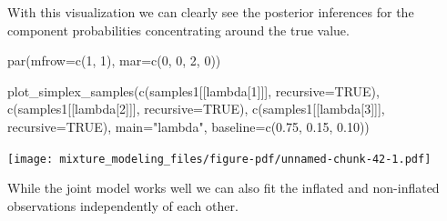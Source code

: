 \documentclass[
  letterpaper,
  DIV=11,
  numbers=noendperiod]{scrartcl}
\newenvironment{Shaded}{\begin{snugshade}}{\end{snugshade}}
\newcommand{\AttributeTok}[1]{\textcolor[rgb]{0.40,0.45,0.13}{#1}}
\newcommand{\ConstantTok}[1]{\textcolor[rgb]{0.56,0.35,0.01}{#1}}
\newcommand{\DecValTok}[1]{\textcolor[rgb]{0.68,0.00,0.00}{#1}}
\newcommand{\FloatTok}[1]{\textcolor[rgb]{0.68,0.00,0.00}{#1}}
\newcommand{\FunctionTok}[1]{\textcolor[rgb]{0.28,0.35,0.67}{#1}}
\newcommand{\NormalTok}[1]{\textcolor[rgb]{0.00,0.23,0.31}{#1}}
\newcommand{\OtherTok}[1]{\textcolor[rgb]{0.00,0.23,0.31}{#1}}
\newcommand{\SpecialCharTok}[1]{\textcolor[rgb]{0.37,0.37,0.37}{#1}}
\newcommand{\StringTok}[1]{\textcolor[rgb]{0.13,0.47,0.30}{#1}}
\begin{document}
With this visualization we can clearly see the posterior inferences for
the component probabilities concentrating around the true value.

\begin{Shaded}
\begin{Highlighting}[]
\FunctionTok{par}\NormalTok{(}\AttributeTok{mfrow=}\FunctionTok{c}\NormalTok{(}\DecValTok{1}\NormalTok{, }\DecValTok{1}\NormalTok{), }\AttributeTok{mar=}\FunctionTok{c}\NormalTok{(}\DecValTok{0}\NormalTok{, }\DecValTok{0}\NormalTok{, }\DecValTok{2}\NormalTok{, }\DecValTok{0}\NormalTok{))}

\FunctionTok{plot\_simplex\_samples}\NormalTok{(}\FunctionTok{c}\NormalTok{(samples1[[}\StringTok{\textquotesingle{}lambda[1]\textquotesingle{}}\NormalTok{]], }\AttributeTok{recursive=}\ConstantTok{TRUE}\NormalTok{),}
                     \FunctionTok{c}\NormalTok{(samples1[[}\StringTok{\textquotesingle{}lambda[2]\textquotesingle{}}\NormalTok{]], }\AttributeTok{recursive=}\ConstantTok{TRUE}\NormalTok{),}
                     \FunctionTok{c}\NormalTok{(samples1[[}\StringTok{\textquotesingle{}lambda[3]\textquotesingle{}}\NormalTok{]], }\AttributeTok{recursive=}\ConstantTok{TRUE}\NormalTok{),}
                     \AttributeTok{main=}\StringTok{"lambda"}\NormalTok{, }\AttributeTok{baseline=}\FunctionTok{c}\NormalTok{(}\FloatTok{0.75}\NormalTok{, }\FloatTok{0.15}\NormalTok{, }\FloatTok{0.10}\NormalTok{))}
\end{Highlighting}
\end{Shaded}

\texttt{[image: mixture\_modeling\_files/figure-pdf/unnamed-chunk-42-1.pdf]}

While the joint model works well we can also fit the inflated and
non-inflated observations independently of each other.

\begin{Shaded}
\end{Shaded}
\end{document}
